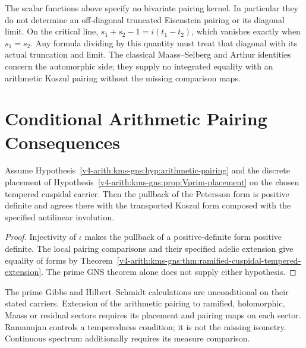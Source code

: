 \begin{remark}
\label{v4-arith:kms-gns:rem:continuum-honest-domain}
The scalar functions above specify no bivariate pairing kernel.
In particular they do not determine an off-diagonal truncated
Eisenstein pairing or its diagonal limit. On the critical line,
\(s_1+\overline{s_2}-1=i(t_1-t_2)\), which vanishes exactly when
\(s_1=s_2\). Any formula dividing by this quantity must treat that
diagonal with its actual truncation and limit. The classical
Maass--Selberg and Arthur identities concern the automorphic
side; they supply no integrated equality with an arithmetic
Koszul pairing without the missing comparison maps.
\end{remark}

\section{Conditional Arithmetic Pairing Consequences}
\label{v4-arith:kms-gns:P3}

\begin{theorem}
\label{v4-arith:kms-gns:thm:P3-tempered-cuspidal}
Assume Hypothesis~\ref{v4-arith:kms-gns:hyp:arithmetic-pairing} and
the discrete placement of
Hypothesis~\ref{v4-arith:kms-gns:prop:Vprim-placement} on the chosen
tempered cuspidal carrier. Then the pullback of the Petersson form
is positive definite and agrees there with the transported Koszul
form composed with the specified antilinear involution.
\end{theorem}
\begin{proof}
Injectivity of \(\iota\) makes the pullback of a positive-definite
form positive definite. The local pairing comparisons and their
specified adelic extension give equality of forms by
Theorem~\ref{v4-arith:kms-gns:thm:ramified-cuspidal-tempered-extension}.
The prime GNS theorem alone does not supply either hypothesis.
\end{proof}

\begin{remark}
\label{v4-arith:kms-gns:rem:P3-domain-enlargement}
The prime Gibbs and Hilbert--Schmidt calculations are unconditional
on their stated carriers. Extension of the arithmetic pairing to
ramified, holomorphic, Maass or residual sectors requires its
placement and pairing maps on each sector. Ramanujan controls a
temperedness condition; it is not the missing isometry. Continuous
spectrum additionally requires its measure comparison.
\end{remark}

